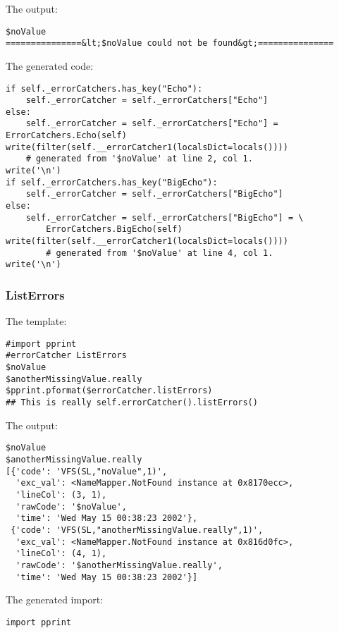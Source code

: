 The output:
\begin{verbatim}
$noValue
===============&lt;$noValue could not be found&gt;===============
\end{verbatim}

The generated code:
\begin{verbatim}
if self._errorCatchers.has_key("Echo"):
    self._errorCatcher = self._errorCatchers["Echo"]
else:
    self._errorCatcher = self._errorCatchers["Echo"] = ErrorCatchers.Echo(self)
write(filter(self.__errorCatcher1(localsDict=locals()))) 
    # generated from '$noValue' at line 2, col 1.
write('\n')
if self._errorCatchers.has_key("BigEcho"):
    self._errorCatcher = self._errorCatchers["BigEcho"]
else:
    self._errorCatcher = self._errorCatchers["BigEcho"] = \
        ErrorCatchers.BigEcho(self)
write(filter(self.__errorCatcher1(localsDict=locals()))) 
        # generated from '$noValue' at line 4, col 1.
write('\n')
\end{verbatim}


\subsubsection{ListErrors}
\label{errorHandling.errorCatcher.listErrors}

The template:
\begin{verbatim}
#import pprint
#errorCatcher ListErrors
$noValue
$anotherMissingValue.really
$pprint.pformat($errorCatcher.listErrors)
## This is really self.errorCatcher().listErrors()
\end{verbatim}

The output:
\begin{verbatim}
$noValue
$anotherMissingValue.really
[{'code': 'VFS(SL,"noValue",1)',
  'exc_val': <NameMapper.NotFound instance at 0x8170ecc>,
  'lineCol': (3, 1),
  'rawCode': '$noValue',
  'time': 'Wed May 15 00:38:23 2002'},
 {'code': 'VFS(SL,"anotherMissingValue.really",1)',
  'exc_val': <NameMapper.NotFound instance at 0x816d0fc>,
  'lineCol': (4, 1),
  'rawCode': '$anotherMissingValue.really',
  'time': 'Wed May 15 00:38:23 2002'}]
\end{verbatim}

The generated import:
\begin{verbatim}
import pprint
\end{verbatim}

